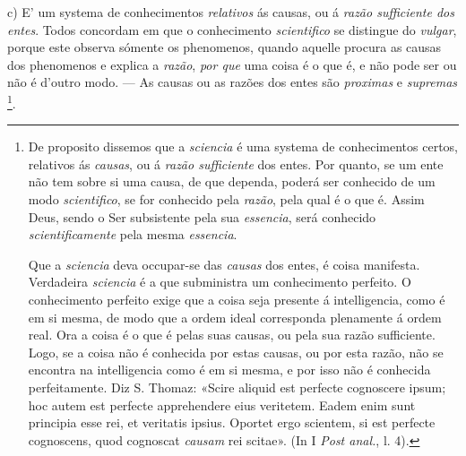 c) E' um systema de conhecimentos \emph{relativos} ás causas, ou á \emph{razão sufficiente dos entes}. Todos concordam em que o conhecimento \emph{scientifico} se distingue do \emph{vulgar}, porque este observa sómente os phenomenos, quando aquelle procura as causas dos   phenomenos e explica a \emph{razão}, \emph{por que} uma coisa é o que é, e não pode ser ou não é d'outro modo. --- As causas ou as razões dos entes são \emph{proximas} e \emph{supremas} \footnote{De proposito dissemos que a \emph{sciencia} é uma systema de conhecimentos certos, relativos ás \emph{causas}, ou á \emph{razão sufficiente} dos entes. Por quanto, se um ente não tem sobre si uma causa, de que dependa, poderá ser conhecido de um modo \emph{scientifico}, se for conhecido pela \emph{razão}, pela qual é o que é. Assim Deus, sendo o Ser subsistente pela sua \emph{essencia}, será conhecido \emph{scientificamente} pela mesma \emph{essencia}.\par Que a \emph{sciencia} deva occupar-se das \emph{causas} dos entes, é coisa manifesta. Verdadeira \emph{sciencia} é a que subministra um conhecimento perfeito. O conhecimento perfeito exige que a coisa seja presente á intelligencia, como é em si mesma, de modo que a ordem ideal corresponda plenamente á ordem real. Ora a coisa é o que é pelas suas causas, ou pela sua razão sufficiente. Logo, se a coisa não é conhecida por estas causas, ou por esta razão, não se encontra na intelligencia como é em si mesma, e por isso não é conhecida perfeitamente. Diz S. Thomaz: «Scire aliquid est perfecte cognoscere ipsum; hoc autem est perfecte apprehendere eius veritetem. Eadem enim sunt principia esse rei, et veritatis ipsius. Oportet ergo scientem, si est perfecte cognoscens, quod cognoscat \emph{causam} rei scitae». (In I \emph{Post anal.}, l. 4).}.

